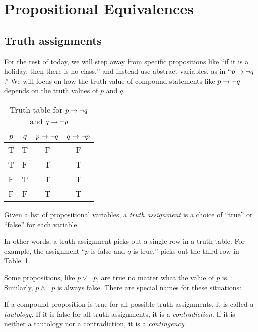 \section{Propositional Equivalences}
\subsection{Truth assignments}
For the rest of today, we will step away from specific propositions
like ``if it is a holiday, then there is no class,'' and instead use
abstract variables, as in ``$p \rightarrow \lnot q$.''  We will focus on
how the truth value of compound statements like $p \rightarrow \lnot q$
depends on the truth values of $p$ and $q$.

\begin{table} \centering
  \label{tab:pimpnq}
  \begin{tabular}{| c | c | c | c |}
    \hline
    $p$ & $q$ & $p \rightarrow \lnot q$ & $q \rightarrow \lnot p$ \\ \hline
    T & T & F & F \\ \hline
    T & F & T & T \\ \hline
    F & T & T & T \\ \hline
    F & F & T & T\\ \hline
  \end{tabular}
  \caption{Truth table for $p \rightarrow \lnot q$ and $q \rightarrow \lnot p$}
\end{table}

\begin{defn}
  Given a list of propositional variables, a \emph{truth assignment}
  is a choice of ``true'' or ``false'' for each variable.
\end{defn}
In other words, a truth assignment picks out a single row in a truth
table.  For example, the assignment ``$p$ is false and $q$ is true,''
picks out the third row in Table~\ref{tab:pimpnq}.

Some propositions, like $p \lor \lnot p$, are true no matter what the
value of $p$ is.  Similarly, $p \land \lnot p$ is always false.  There
are special names for these situations:

\begin{defn}
  If a compound proposition is true for all possible truth
  assignments, it is called a \emph{tautology}.  If it is false for
  all truth assignments, it is a \emph{contradiction}.  If it is
  neither a tautology nor a contradiction, it is a \emph{contingency}.
\end{defn}

